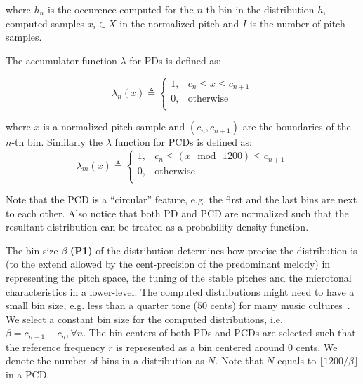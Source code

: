 \documentclass{sig-alternate}
\begin{document}
\noindent
where $h_{n}$ is the occurence computed for the $n$-th bin in the distribution $h$, computed samples $x_i \in X$ in the normalized pitch and $I$ is the number of pitch samples.

The accumulator function $\lambda$ for PDs is defined as:

\begin{equation}
\lambda_{n}(x) \triangleq
\begin{cases}
1, & c_{n} \leq x \leq  c_{n+1} \\
0, & \text{otherwise} \\
\end{cases}
\end{equation}

\noindent
where $x$ is a normalized pitch sample and $(c_{n}, c_{n+1})$ are the boundaries of the $n$-th bin. 
Similarly the $\lambda$ function for PCDs is defined as:
\begin{equation}
\lambda_{m}(x)  \triangleq
\begin{cases}
1, & c_{n} \leq \left(x\,\bmod\,1200\right) \leq  c_{n+1} \\
0, & \text{otherwise} \\
\end{cases}
\end{equation}

Note that the PCD is a ``circular'' feature, e.g. the first and the last bins are next to each other. Also notice that both PD and PCD are normalized such that the resultant distribution can be treated as a probability density function. 

The bin size $\beta$ {\bf (P1)} of the distribution determines how precise the distribution is (to the extend allowed by the cent-precision of the predominant melody) in representing the pitch space, the tuning of the stable pitches and the microtonal characteristics in a lower-level. The computed distributions might need to have a small bin size, e.g. less than a quarter tone ($50$ cents) for many music cultures~\cite{chordia,bozkurt_makam}. We select a constant bin size for the computed distributions, i.e. $\beta = c_{n+1} - c_{n},  \forall n$. The bin centers of both PDs and PCDs are selected such that the reference frequency $r$ is represented as a bin centered around $0$ cents. We denote the number of bins in a distribution as $N$. Note that $N$ equals to $\lfloor1200 / \beta\rfloor$ in a PCD.
\end{document}
